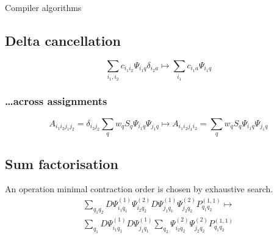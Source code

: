 \documentclass[a0paper,portrait]{baposter}
\begin{document}
\begin{poster}
\begin{posterbox}[name=rules, column=0, below=structure, span=3,
    height=0.275]{Compiler algorithms}
    \subsection*{Delta cancellation}
    \vspace{-0.25\baselineskip}
    \begin{equation*}
      \sum_{i_1, i_2} c_{i_1 i_2} \Psi_{i_1 q}
      \delta_{i_2 a} \mapsto \sum_{i_1} c_{i_1 a}\Psi_{i_1 q}
    \end{equation*}
    \vspace{-2\baselineskip}
    \subsubsection*{\dots across assignments}
    \vspace{-0.25\baselineskip}
    \begin{equation*}
      A_{i_1 i_2 j_1 j_2} = \delta_{i_2 j_2} \sum_q w_q S_q \Psi_{i_1 q}\Psi_{j_1 q} \mapsto A_{i_1 i_2 j_1 i_2} = \sum_q w_q S_q \Psi_{i_1 q}\Psi_{j_1 q}
    \end{equation*}
    \vspace{-1.75\baselineskip}
    \subsection*{Sum factorisation}
    \vspace{-0.25\baselineskip}
    An operation minimal contraction order is chosen by exhaustive search.
    \begin{align*}
      \sum_{q_1 q_2} D\Psi^{(1)}_{i_1 q_1}\Psi^{(2)}_{i_2 q_2}
      D\Psi^{(1)}_{j_1 q_1}\Psi^{(2)}_{j_2 q_2} P^{(1,1)}_{q_1 q_2}
      \mapsto \\
      \sum_{q_1} D\Psi^{(1)}_{i_1 q_1} D\Psi^{(1)}_{j_1 q_1} \sum_{q_2}  \Psi^{(2)}_{i_2 q_2}\Psi^{(2)}_{j_2 q_2} P^{(1,1)}_{q_1 q_2}
    \end{align*}
  \end{posterbox}


\end{poster}
\end{document}
